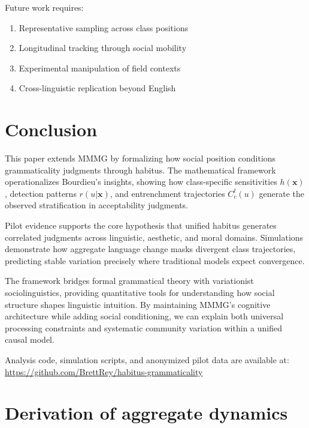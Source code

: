 \documentclass[12pt]{article}
\begin{document}
Future work requires:
\begin{enumerate}
\item Representative sampling across class positions
\item Longitudinal tracking through social mobility
\item Experimental manipulation of field contexts
\item Cross-linguistic replication beyond English
\end{enumerate}

\section{Conclusion}

This paper extends MMMG by formalizing how social position conditions grammaticality judgments through habitus. The mathematical framework operationalizes Bourdieu's insights, showing how class-specific sensitivities $h(\mathbf{x})$, detection patterns $r(u|\mathbf{x})$, and entrenchment trajectories $C^t_c(u)$ generate the observed stratification in acceptability judgments.

Pilot evidence supports the core hypothesis that unified habitus generates correlated judgments across linguistic, aesthetic, and moral domains. Simulations demonstrate how aggregate language change masks divergent class trajectories, predicting stable variation precisely where traditional models expect convergence.

The framework bridges formal grammatical theory with variationist sociolinguistics, providing quantitative tools for understanding how social structure shapes linguistic intuition. By maintaining MMMG's cognitive architecture while adding social conditioning, we can explain both universal processing constraints and systematic community variation within a unified causal model.

\begin{tcolorbox}[colback=lsLightBlue!20,title=Data and code availability]
Analysis code, simulation scripts, and anonymized pilot data are available at: 
\url{https://github.com/BrettRey/habitus-grammaticality}
\end{tcolorbox}

\appendix

\section{Derivation of aggregate dynamics}
\end{document}
